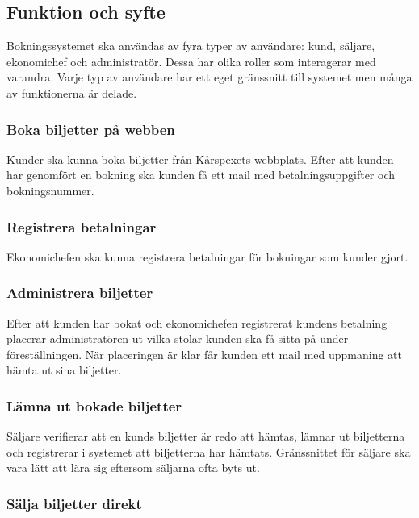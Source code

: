 \documentclass[a4paper, twoside, 11pt, titlepage]{article}
\begin{document}
	\subsection{Funktion och syfte}


	Bokningssystemet ska användas av fyra typer av användare: kund, säljare, ekonomichef och administratör. Dessa har olika roller som interagerar med varandra. Varje typ av användare har ett eget gränssnitt till systemet men många av funktionerna är delade.

		\subsubsection{Boka biljetter på webben}


		Kunder ska kunna boka biljetter från Kårspexets webbplats. Efter att kunden har genomfört en bokning ska kunden få ett mail med betalningsuppgifter och bokningsnummer.

		\subsubsection{Registrera betalningar}


		Ekonomichefen ska kunna registrera betalningar för bokningar som kunder gjort.

		\subsubsection{Administrera biljetter}


		Efter att kunden har bokat och ekonomichefen registrerat kundens betalning placerar administratören ut vilka stolar kunden ska få sitta på under föreställningen. När placeringen är klar får kunden ett mail med uppmaning att hämta ut sina biljetter.

		\subsubsection{Lämna ut bokade biljetter}


		Säljare verifierar att en kunds biljetter är redo att hämtas, lämnar ut biljetterna och registrerar i systemet att biljetterna har hämtats. Gränssnittet för säljare ska vara lätt att lära sig eftersom säljarna ofta byts ut.

		\subsubsection{Sälja biljetter direkt}
\end{document}
